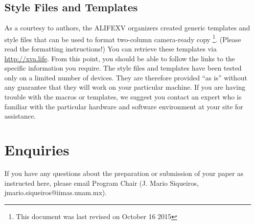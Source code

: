 \documentclass[letterpaper]{article}
\begin{document}
\subsection{Style Files and Templates}
As a courtesy to authors, the ALIFEXV organizers created generic templates 
and style files that can be used to format two-column camera-ready copy
\footnote{This document was last revised on October 16 2015}. 
(Please read the formatting instructions!) You can retrieve these templates 
via \href{url}{http://xva.life}.
From this point, you should be able to follow the 
links to the specific information you require. 
The style files and templates have been tested only on a limited number 
of devices. They are therefore provided ``as is'' without any guarantee 
that they will work on your particular machine. If you are having trouble 
with the macros or templates, we suggest you contact an expert who is 
familiar with the particular hardware and software environment at your 
site for assistance. 

\section{Enquiries}
If you have any questions about the preparation or submission of your paper as instructed here, please email Program Chair (J. Mario Siqueiros, jmario.siqueiros@iimas.unam.mx).	



\end{document}
